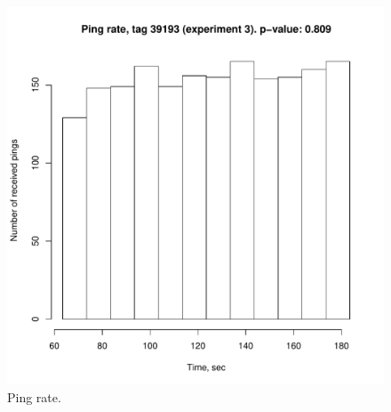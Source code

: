 \documentclass{article}
\begin{document}
\begin{figure}
  \begin{center}
    \includegraphics[trim=0cm 0cm 0cm 0cm,clip,angle=0,width=1\textwidth]{experiment3/pingrate.pdf}
  \end{center}
  \caption{Ping rate.}
\label{fig:ex3}
\end{figure}

%

\end{document}
